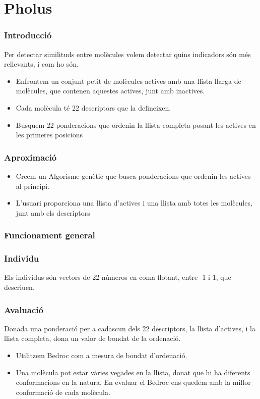 \documentclass{beamer}
\begin{document}
\section{Pholus} %
\label{sec:Pholus}

\begin{frame}
	\frametitle{Introducció}
	Per detectar similituds entre molècules volem detectar quins indicadors són
	més rellevants, i com ho són. 
	\pause
	\begin{itemize}
		\item Enfrontem un conjunt petit de molècules actives amb una llista llarga de molècules,
			que contenen aquestes actives, junt amb inactives.
		\item Cada molècula té 22 descriptors que la defineixen.
		\item Busquem 22 ponderacions que ordenin la llista completa posant les actives en les
			primeres posicions
	\end{itemize}
\end{frame}

\begin{frame}
\frametitle{Aproximació}
	\begin{itemize}
		\item Creem un Algorisme genètic que busca ponderacions que ordenin les actives al principi.
		\item L'usuari proporciona una llista d'actives i una llista amb totes les molècules, junt
			amb els descriptors
	\end{itemize}
\end{frame}

\begin{frame}
\frametitle{Funcionament general}
\end{frame}

\begin{frame}
	\frametitle{Individu}
	Els individus són vectors de 22 números en coma flotant, entre -1 i 1, que descriuen.
\end{frame}

\begin{frame}
	\frametitle{Avaluació}
	\begin{block}{}
		Donada una ponderació per a cadascun dels 22 descriptors, la llista d'actives, i la llista
		completa, dona un valor de bondat de la ordenació.
	\end{block}
	\pause
	\begin{itemize}
		\item Utilitzem Bedroc com a mesura de bondat d'ordenació.
		\item Una molècula pot estar vàries vegades en la llista, donat que hi ha diferents
			conformacions en la natura.  En evaluar el Bedroc ens quedem amb la millor conformació
			de cada molècula.
	\end{itemize}
\end{frame}
\end{document}

